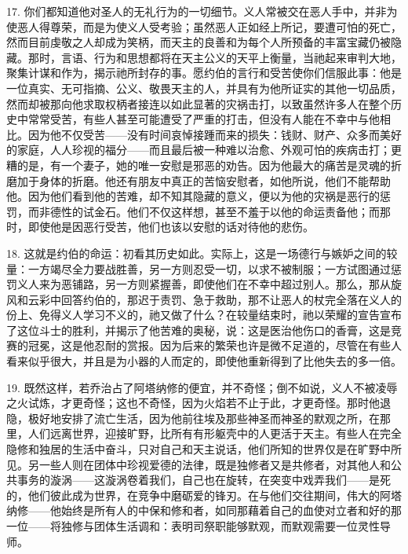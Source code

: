 17. 你们都知道他对圣人的无礼行为的一切细节。义人常被交在恶人手中，并非为使恶人得尊荣，而是为使义人受考验；虽然恶人正如经上所记，要遭可怕的死亡，然而目前虔敬之人却成为笑柄，而天主的良善和为每个人所预备的丰富宝藏仍被隐藏。那时，言语、行为和思想都将在天主公义的天平上衡量，当祂起来审判大地，聚集计谋和作为，揭示祂所封存的事。愿约伯的言行和受苦使你们信服此事：他是一位真实、无可指摘、公义、敬畏天主的人，并具有为他所证实的其他一切品质，然而却被那向他求取权柄者接连以如此显著的灾祸击打，以致虽然许多人在整个历史中常常受苦，有些人甚至可能遭受了严重的打击，但没有人能在不幸中与他相比。因为他不仅受苦——没有时间哀悼接踵而来的损失：钱财、财产、众多而美好的家庭，人人珍视的福分——而且最后被一种难以治愈、外观可怕的疾病击打；更糟的是，有一个妻子，她的唯一安慰是邪恶的劝告。因为他最大的痛苦是灵魂的折磨加于身体的折磨。他还有朋友中真正的苦恼安慰者，如他所说，他们不能帮助他。因为他们看到他的苦难，却不知其隐藏的意义，便以为他的灾祸是恶行的惩罚，而非德性的试金石。他们不仅这样想，甚至不羞于以他的命运责备他；而那时，即使他是因恶行受苦，他们也该以安慰的话对待他的悲伤。\par

18. 这就是约伯的命运：初看其历史如此。实际上，这是一场德行与嫉妒之间的较量：一方竭尽全力要战胜善，另一方则忍受一切，以求不被制服；一方试图通过惩罚义人来为恶铺路，另一方则紧握善，即使他们在不幸中超过别人。那么，那从旋风和云彩中回答约伯的，那迟于责罚、急于救助，那不让恶人的杖完全落在义人的份上、免得义人学习不义的，祂又做了什么？在较量结束时，祂以荣耀的宣告宣布了这位斗士的胜利，并揭示了他苦难的奥秘，说：这是医治他伤口的香膏，这是竞赛的冠冕，这是他忍耐的赏报。因为后来的繁荣也许是微不足道的，尽管在有些人看来似乎很大，并且是为小器的人而定的，即使他重新得到了比他失去的多一倍。\par

19. 既然这样，若乔治占了阿塔纳修的便宜，并不奇怪；倒不如说，义人不被凌辱之火试炼，才更奇怪；这也不奇怪，因为火焰若不止于此，才更奇怪。那时他退隐，极好地安排了流亡生活，因为他前往埃及那些神圣而神圣的默观之所，在那里，人们远离世界，迎接旷野，比所有有形躯壳中的人更活于天主。有些人在完全隐修和独居的生活中奋斗，只对自己和天主说话，他们所知的世界仅是在旷野中所见。另一些人则在团体中珍视爱德的法律，既是独修者又是共修者，对其他人和公共事务的漩涡——这漩涡卷着我们，自己也在旋转，在突变中戏弄我们——是死的，他们彼此成为世界，在竞争中磨砺爱的锋刃。在与他们交往期间，伟大的阿塔纳修——他始终是所有人的中保和修和者，如同那藉着自己的血使对立者和好的那一位——将独修与团体生活调和：表明司祭职能够默观，而默观需要一位灵性导师。\par

